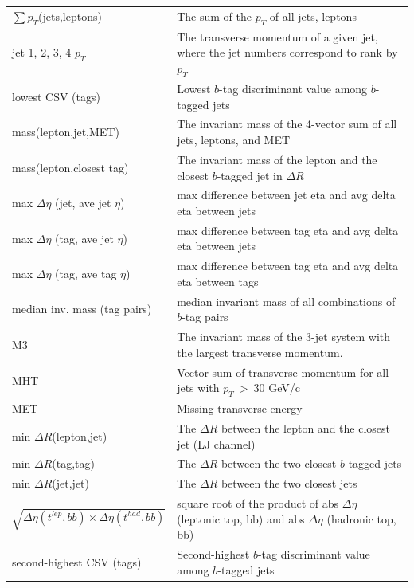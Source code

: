\begin{table}[hbtp]
\begin{tabular}{| l | p{10cm} |}
   \(\sum p_{T}\)(jets,leptons)  							&  The sum of the \(p_{T}\) of all jets, leptons \\
   jet 1, 2, 3, 4 \(p_{T}\)  							&  The transverse momentum of a given jet, where the jet numbers correspond to rank by \(p_{T}\) \\
   lowest CSV (tags)  								&  Lowest $b$-tag discriminant value among $b$-tagged jets \\
   mass(lepton,jet,MET)  								&  The invariant mass of the 4-vector sum of all jets, leptons, and MET \\
   mass(lepton,closest tag) 							& The invariant mass of the lepton and the closest $b$-tagged jet in \(\Delta R\) \\
   max \(\Delta \eta\) (jet, ave jet \(\eta\))  					&  max difference between jet eta and avg delta eta between jets \\
   max \(\Delta \eta\) (tag, ave jet \(\eta\)) 					&  max difference between tag eta and avg delta eta between jets \\
   max \(\Delta \eta\) (tag, ave tag \(\eta\)) 					&  max difference between tag eta and avg delta eta between tags \\
   median inv. mass (tag pairs)							&  median invariant mass of all combinations of $b$-tag pairs \\
   M3										& The invariant mass of the 3-jet system with the largest transverse momentum. \\
   MHT  										&  Vector sum of transverse momentum for all jets with \(p_{T}~>~30\) GeV/c \\
   MET  										&  Missing transverse energy \\
   min \(\Delta R\)(lepton,jet)  							&  The \(\Delta R\) between the lepton and the closest jet (LJ channel)  \\
   min \(\Delta R\)(tag,tag) 	 						&  The \(\Delta R\) between the two closest $b$-tagged jets \\
   min \(\Delta R\)(jet,jet)  							&  The \(\Delta R\) between the two closest jets \\
   $\sqrt{\Delta \eta(t^{lep}, bb) \times \Delta \eta(t^{had}, bb)}$		&  square root of the product of abs \(\Delta \eta\) (leptonic top, bb) and abs \(\Delta \eta\) (hadronic top, bb) \\
   second-highest CSV (tags)  							&  Second-highest $b$-tag discriminant value among $b$-tagged jets \\

\end{tabular}
\end{table}
